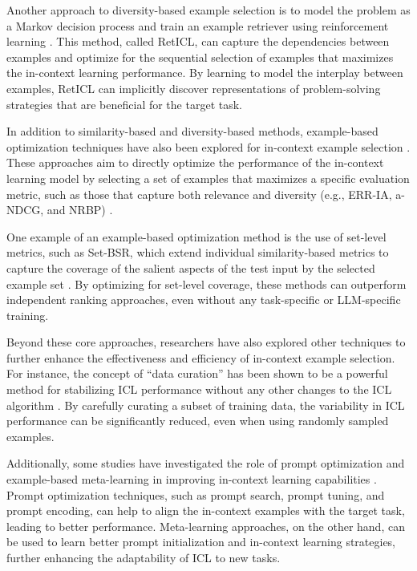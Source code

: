\documentclass[11pt]{article}
\begin{document}
Another approach to diversity-based example selection is to model the problem as a Markov decision process and train an example retriever using reinforcement learning \cite{ref74}. This method, called RetICL, can capture the dependencies between examples and optimize for the sequential selection of examples that maximizes the in-context learning performance. By learning to model the interplay between examples, RetICL can implicitly discover representations of problem-solving strategies that are beneficial for the target task.

In addition to similarity-based and diversity-based methods, example-based optimization techniques have also been explored for in-context example selection \cite{ref73}. These approaches aim to directly optimize the performance of the in-context learning model by selecting a set of examples that maximizes a specific evaluation metric, such as those that capture both relevance and diversity (e.g., ERR-IA, a-NDCG, and NRBP) \cite{ref75}.

One example of an example-based optimization method is the use of set-level metrics, such as Set-BSR, which extend individual similarity-based metrics to capture the coverage of the salient aspects of the test input by the selected example set \cite{ref73}. By optimizing for set-level coverage, these methods can outperform independent ranking approaches, even without any task-specific or LLM-specific training.

Beyond these core approaches, researchers have also explored other techniques to further enhance the effectiveness and efficiency of in-context example selection. For instance, the concept of ``data curation'' has been shown to be a powerful method for stabilizing ICL performance without any other changes to the ICL algorithm \cite{ref76}. By carefully curating a subset of training data, the variability in ICL performance can be significantly reduced, even when using randomly sampled examples.

Additionally, some studies have investigated the role of prompt optimization and example-based meta-learning in improving in-context learning capabilities \cite{ref77,ref78}. Prompt optimization techniques, such as prompt search, prompt tuning, and prompt encoding, can help to align the in-context examples with the target task, leading to better performance. Meta-learning approaches, on the other hand, can be used to learn better prompt initialization and in-context learning strategies, further enhancing the adaptability of ICL to new tasks.
\end{document}
